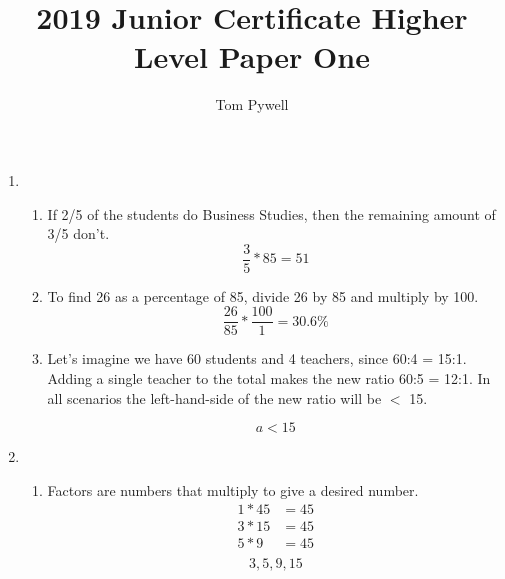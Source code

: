 \documentclass[11pt]{article}
\begin{document}
\author{Tom Pywell}
\title{2019 Junior Certificate Higher Level Paper One}
\maketitle

\medskip

\begin{enumerate}
    \pagebreak
    \item
        \begin{enumerate}
            \item If 2/5 of the students do Business Studies, then the remaining amount of 3/5 don't.
                \begin{equation*}
                \frac{3}{5} * 85 = 51
                \end{equation*}
            \item To find 26 as a percentage of 85, divide 26 by 85 and multiply by 100.
                \begin{equation*}
                    \frac{26}{85} * \frac{100}{1} = 30.6\%
                \end{equation*}
            \item
                Let's imagine we have 60 students and 4 teachers, since 60:4 = 15:1.
                Adding a single teacher to the total makes the new ratio 60:5 = 12:1.
                In all scenarios the left-hand-side of the new ratio will be $<$ 15.
                
                \begin{equation*}
                    a < 15
                \end{equation*}
        \end{enumerate}
    
    \pagebreak
    \item
        \begin{enumerate}
            \item Factors are numbers that multiply to give a desired number.
                \begin{equation*}
                    \begin{split}
                        1*45&=45\\
                        3*15&=45\\
                         5*9&=45\\
                    \end{split}
                \end{equation*}
                \begin{equation*}
                3,5,9,15
                \end{equation*}
                

\end{enumerate}
\end{enumerate}
\end{document}
